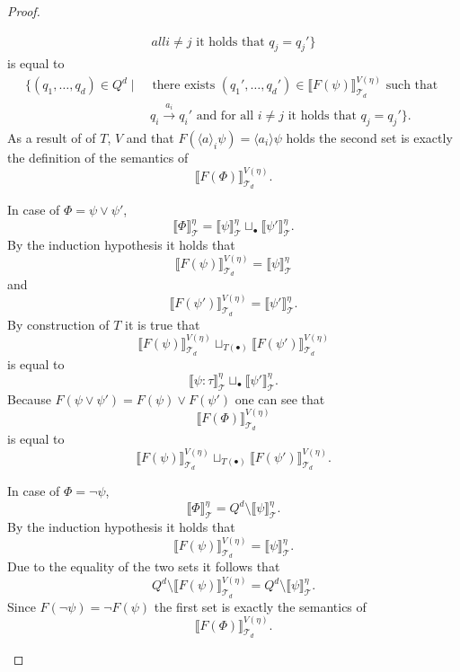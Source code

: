 \begin{proof}
\begin{compactitem}
\begin{align*}
{            all } i \neq j \text{ it holds that } q_j = {q_j}'\}
        \end{align*}
        is equal to
        \begin{align*}
            \{(q_1, \dots, q_d) \in Q^d \mid &\text{ there exists } ({q_1}', \dots, {q_d}') \in \llbracket F(\psi) \rrbracket^{V(\eta)}_{\mathcal{T}_d} \text{ such that }\\&\,q_i
            \overset{a_i}{\rightarrow} {q_i}' \text{ and for all } i \neq j \text{ it holds that } q_j = {q_j}'\}.
        \end{align*}
        As a result of of $T$, $V$ and that $F(\langle a \rangle_i \psi) = \langle a_i \rangle \psi$ holds the second set is
        exactly the definition of the semantics of
        \[\llbracket F(\Phi) \rrbracket^{V(\eta)}_{\mathcal{T}_d}.\]

        \item In case of $\Phi = \psi \vee {\psi'}$, 
        \[\llbracket \Phi \rrbracket^\eta_\mathcal{T} = \llbracket \psi
        \rrbracket^\eta_\mathcal{T} \sqcup_\bullet \llbracket \psi'
        \rrbracket^\eta_\mathcal{T}.\]
        By the induction hypothesis it holds that \[\llbracket F(\psi) \rrbracket^{V(\eta)}_{\mathcal{T}_d} = \llbracket \psi \rrbracket^\eta_\mathcal{T}\]
        and
        \[\llbracket F(\psi') \rrbracket^{V(\eta)}_{\mathcal{T}_d} = \llbracket \psi' \rrbracket^\eta_\mathcal{T}.\]
        By construction of $T$ it is true that
        \[\llbracket F(\psi) \rrbracket^{V(\eta)}_{\mathcal{T}_d} \sqcup_{T(\bullet)} \llbracket F(\psi') \rrbracket^{V(\eta)}_{\mathcal{T}_d}\]
        is equal to
        \[\llbracket \psi
        \colon \tau \rrbracket^\eta_\mathcal{T} \sqcup_\bullet \llbracket \psi' 
        \rrbracket^\eta_\mathcal{T}.\]
        Because $F(\psi \vee \psi') = F(\psi) \vee F(\psi')$ one can see that
        \[\llbracket F(\Phi) \rrbracket^{V(\eta)}_{\mathcal{T}_d}\]
        is equal to
        \[\llbracket F(\psi) \rrbracket^{V(\eta)}_{\mathcal{T}_d} \sqcup_{T(\bullet)}
        \llbracket F(\psi') \rrbracket^{V(\eta)}_{\mathcal{T}_d}.\]

        \item In case of $\Phi = \neg \psi$,
        \[\llbracket \Phi \rrbracket^\eta_\mathcal{T} = Q^d \setminus
        \llbracket \psi \rrbracket^\eta_\mathcal{T}.\]
        By the induction hypothesis it holds that \[\llbracket F(\psi) \rrbracket^{V(\eta)}_{\mathcal{T}_d} = \llbracket \psi \rrbracket^\eta_\mathcal{T}.\]
        Due to the equality of the two sets it follows that
        \[Q^d \setminus \llbracket F(\psi) \rrbracket^{V(\eta)
        }_{\mathcal{T}_d} =
        Q^d \setminus \llbracket \psi \rrbracket^\eta_\mathcal{T}.\]
        Since $F(\neg \psi) = \neg F(\psi)$ the first set is exactly the semantics of
        \[\llbracket F(\Phi) \rrbracket^{V(\eta)}_{\mathcal{T}_d}.\]


\end{compactitem}
\end{proof}
